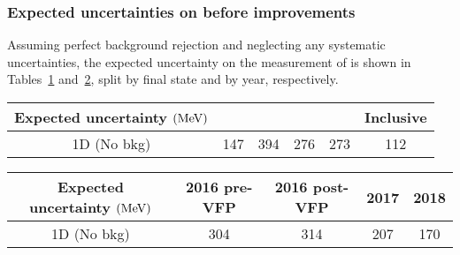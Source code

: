 \subsubsection{Expected uncertainties on \mH before improvements}
Assuming perfect background rejection and neglecting any systematic uncertainties, the expected uncertainty on the measurement of \mH is shown in Tables~\ref{table:1D_model_result_fs} and~\ref{table:1D_model_result_year}, split by final state and by year, respectively.
\begin{table}[!ht]
    \centering
	\begin{tabular}{cccccc}
            \hline      
        Expected uncertainty $(\text{Me\hspace{-.08em}V})$	&	\fourmu	&	\foure	&	\twoetwomu	& \twomutwoe	& Inclusive	\\
            \hline
        1D	(No bkg) &	147	&	394	&	276	&	273	&	112	\\
            \hline
        \end{tabular}
    \label{table:1D_model_result_fs}
\end{table}
\begin{table}[!ht]
    \centering
	\begin{tabular}{|ccccc|}
            \hline      
        Expected uncertainty $(\text{Me\hspace{-.08em}V})$	&	2016 pre-VFP	&	2016 post-VFP	&	2017	&	2018	\\
            \hline
        1D (No bkg)	&	304	&	314	&	207	&	170	\\
            \hline
        \end{tabular}
    \label{table:1D_model_result_year}
\end{table}
